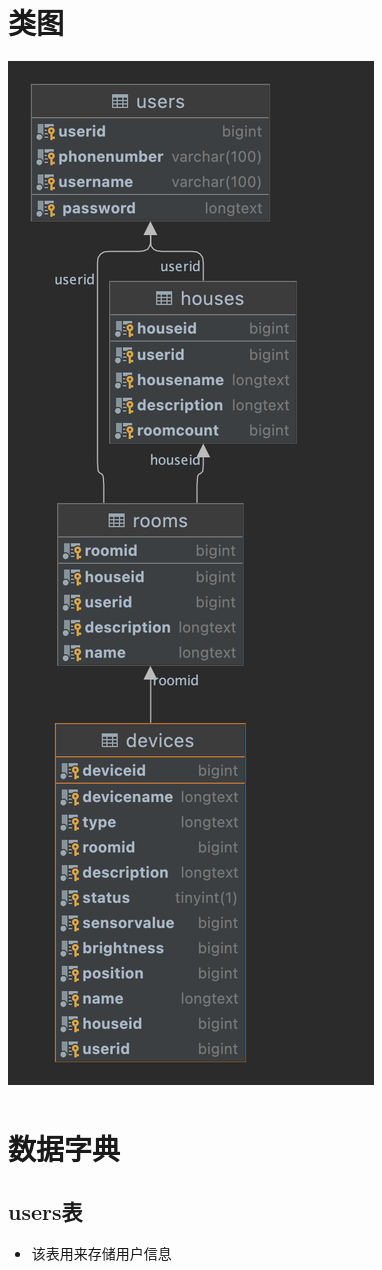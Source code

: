 \documentclass[utf8,a4paper,20pt]{article}
\begin{document}
\section{类图}
\includegraphics*[width=\linewidth]{./assets/devices.png}
\section{数据字典}
\subsection*{users表}
\begin{itemize}
    \item 该表用来存储用户信息
\end{itemize}
\paragraph{}
\end{document}
